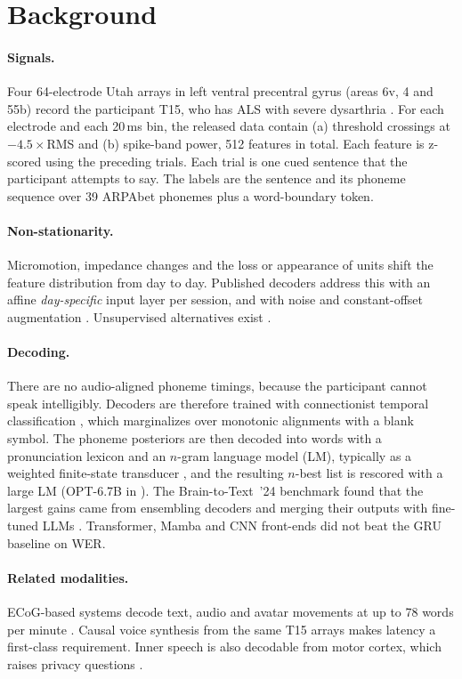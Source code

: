\section{Background}
\label{sec:background}

\paragraph{Signals.} Four 64-electrode Utah arrays in left ventral precentral gyrus (areas 6v, 4 and 55b) record the participant T15, who has ALS with severe dysarthria \citep{card2024accurate}. For each electrode and each 20\,ms bin, the released data contain (a) threshold crossings at $-4.5\times$RMS and (b) spike-band power, 512 features in total. Each feature is z-scored using the preceding trials. Each trial is one cued sentence that the participant attempts to say. The labels are the sentence and its phoneme sequence over 39 ARPAbet phonemes plus a word-boundary token.

\paragraph{Non-stationarity.} Micromotion, impedance changes and the loss or appearance of units shift the feature distribution from day to day. Published decoders address this with an affine \emph{day-specific} input layer per session, and with noise and constant-offset augmentation \citep{sussillo2016robust,willett2021handwriting,willett2023speech}. Unsupervised alternatives exist \citep{fan2023plug}.

\paragraph{Decoding.} There are no audio-aligned phoneme timings, because the participant cannot speak intelligibly. Decoders are therefore trained with connectionist temporal classification \citep[CTC;][]{graves2006ctc}, which marginalizes over monotonic alignments with a blank symbol. The phoneme posteriors are then decoded into words with a pronunciation lexicon and an $n$-gram language model (LM), typically as a weighted finite-state transducer \citep{willett2023speech}, and the resulting $n$-best list is rescored with a large LM (OPT-6.7B in \citealp{card2024accurate}).
The Brain-to-Text~'24 benchmark \citep{willett2024b2t} found that the largest gains came from ensembling decoders and merging their outputs with fine-tuned LLMs \citep{li2024dcond,benster2024lisa}. Transformer, Mamba and CNN front-ends did not beat the GRU baseline on WER.

\paragraph{Related modalities.} ECoG-based systems decode text, audio and avatar movements at up to 78 words per minute \citep{metzger2023avatar,moses2021anarthria}. Causal voice synthesis from the same T15 arrays \citep{wairagkar2025voice} makes latency a first-class requirement. Inner speech is also decodable from motor cortex, which raises privacy questions \citep{kunz2025inner}.
